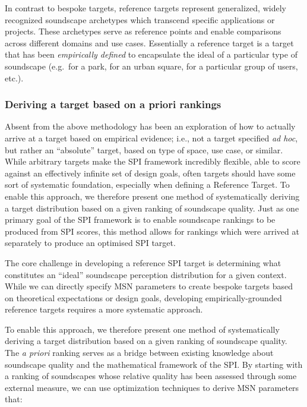 \documentclass[
  authoryear,
  preprint,
  1p]{elsarticle}
\begin{document}
In contrast to bespoke targets, reference targets represent generalized,
widely recognized soundscape archetypes which transcend specific
applications or projects. These archetypes serve as reference points and
enable comparisons across different domains and use cases. Essentially a
reference target is a target that has been \emph{empirically defined} to
encapsulate the ideal of a particular type of soundscape (e.g.~for a
park, for an urban square, for a particular group of users, etc.).

\subsubsection{Deriving a target based on a priori
rankings}\label{sec-targets}

Absent from the above methodology has been an exploration of how to
actually arrive at a target based on empirical evidence; i.e., not a
target specified \emph{ad hoc}, but rather an ``absolute'' target, based
on type of space, use case, or similar. While arbitrary targets make the
SPI framework incredibly flexible, able to score against an effectively
infinite set of design goals, often targets should have some sort of
systematic foundation, especially when defining a Reference Target. To
enable this approach, we therefore present one method of systematically
deriving a target distribution based on a given ranking of soundscape
quality. Just as one primary goal of the SPI framework is to enable
soundscape rankings to be produced from SPI scores, this method allows
for rankings which were arrived at separately to produce an optimised
SPI target.

The core challenge in developing a reference SPI target is determining
what constitutes an ``ideal'' soundscape perception distribution for a
given context. While we can directly specify MSN parameters to create
bespoke targets based on theoretical expectations or design goals,
developing empirically-grounded reference targets requires a more
systematic approach.

To enable this approach, we therefore present one method of
systematically deriving a target distribution based on a given ranking
of soundscape quality. The \emph{a priori} ranking serves as a bridge
between existing knowledge about soundscape quality and the mathematical
framework of the SPI. By starting with a ranking of soundscapes whose
relative quality has been assessed through some external measure, we can
use optimization techniques to derive MSN parameters that:
\end{document}
